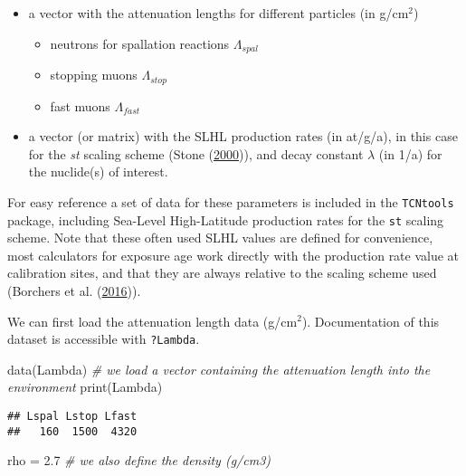 \documentclass[
]{book}
\newenvironment{Shaded}{\begin{snugshade}}{\end{snugshade}}
\newcommand{\CommentTok}[1]{\textcolor[rgb]{0.56,0.35,0.01}{\textit{#1}}}
\newcommand{\FloatTok}[1]{\textcolor[rgb]{0.00,0.00,0.81}{#1}}
\newcommand{\FunctionTok}[1]{\textcolor[rgb]{0.00,0.00,0.00}{#1}}
\newcommand{\NormalTok}[1]{#1}
\newcommand{\OtherTok}[1]{\textcolor[rgb]{0.56,0.35,0.01}{#1}}
\providecommand{\tightlist}{%
  \setlength{\itemsep}{0pt}\setlength{\parskip}{0pt}}
\begin{document}
\begin{itemize}
\tightlist
\item
  a vector with the attenuation lengths for different particles (in g/cm\(^2\))

  \begin{itemize}
  \tightlist
  \item
    neutrons for spallation reactions \(\Lambda_{spal}\)
  \item
    stopping muons \(\Lambda_{stop}\)
  \item
    fast muons \(\Lambda_{fast}\)\\
  \end{itemize}
\item
  a vector (or matrix) with the SLHL production rates (in at/g/a), in this case for the \emph{st} scaling scheme (Stone (\protect\hyperlink{ref-stone2000air}{2000})), and decay constant \(\lambda\) (in 1/a) for the nuclide(s) of interest.
\end{itemize}

For easy reference a set of data for these parameters is included in the \texttt{TCNtools} package, including Sea-Level High-Latitude production rates for the \texttt{st} scaling scheme.
Note that these often used SLHL values are defined for convenience, most calculators for exposure age work directly with the production rate value at calibration sites, and that they are always relative to the scaling scheme used (Borchers et al. (\protect\hyperlink{ref-borchers2016geological}{2016})).

We can first load the attenuation length data (g/cm\(^2\)).
Documentation of this dataset is accessible with \texttt{?Lambda}.

\begin{Shaded}
\begin{Highlighting}[]
\FunctionTok{data}\NormalTok{(Lambda) }\CommentTok{\# we load a vector containing the attenuation length into the environment}
\FunctionTok{print}\NormalTok{(Lambda)}
\end{Highlighting}
\end{Shaded}

\begin{verbatim}
## Lspal Lstop Lfast 
##   160  1500  4320
\end{verbatim}

\begin{Shaded}
\begin{Highlighting}[]
\NormalTok{rho }\OtherTok{=} \FloatTok{2.7} \CommentTok{\# we also define the density (g/cm3)}
\end{Highlighting}
\end{Shaded}
\end{document}
